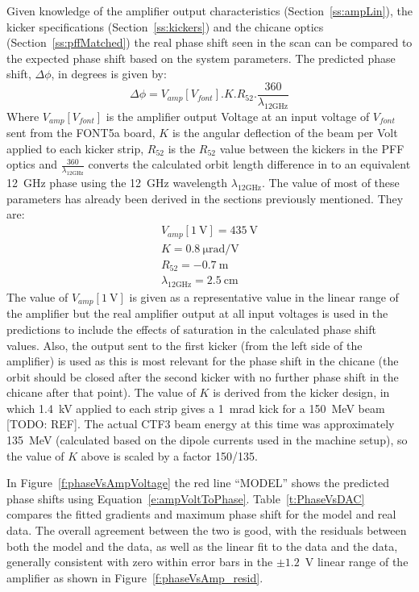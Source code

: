 Given knowledge of the amplifier output characteristics (Section~\ref{ss:ampLin}), the kicker specifications (Section~\ref{ss:kickers}) and the chicane optics (Section~\ref{ss:pffMatched}) the real phase shift seen in the scan can be compared to the expected phase shift based on the system parameters. The predicted phase shift, \(\Delta\phi\), in degrees is given by:
\begin{equation}
 	\Delta\phi = V_{amp}[V_{font}].K.R_{52}.\frac{360}{\lambda_{12\mathrm{GHz}}}
\end{equation} 
\label{e:ampVoltToPhase}
Where \(V_{amp}[V_{font}]\) is the amplifier output Voltage at an input voltage of \(V_{font}\) sent from the FONT5a board, \(K\) is the angular deflection of the beam per Volt applied to each kicker strip, \(R_{52}\) is the \(R_{52}\) value between the kickers in the PFF optics and \(\frac{360}{\lambda_{12\mathrm{GHz}}}\) converts the calculated orbit length difference in to an equivalent 12~GHz phase using the 12~GHz wavelength \(\lambda_{12\mathrm{GHz}}\). The value of most of these parameters has already been derived in the sections previously mentioned. They are:
\begin{eqnarray*}
V_{amp}[1~\mathrm{V}] = 435~\mathrm{V} \\
K = 0.8~\mathrm{\mu rad/V}\\
R_{52} = -0.7~\mathrm{m}\\
\lambda_{12\mathrm{GHz}} = 2.5~\mathrm{cm} 
\end{eqnarray*}
The value of \(V_{amp}[1~\mathrm{V}]\) is given as a representative value in the linear range of the amplifier but the real amplifier output at all input voltages is used in the predictions to include the effects of saturation in the calculated phase shift values. Also, the output sent to the first kicker (from the left side of the amplifier) is used as this is most relevant for the phase shift in the chicane (the orbit should be closed after the second kicker with no further phase shift in the chicane after that point). The value of \(K\) is derived from the kicker design, in which 1.4~kV applied to each strip gives a 1~mrad kick for a 150~MeV beam [TODO: REF].  The actual CTF3 beam energy at this time was approximately 135~MeV (calculated based on the dipole currents used in the machine setup), so the value of \(K\) above is scaled by a factor 150/135.

In Figure~\ref{f:phaseVsAmpVoltage} the red line ``MODEL'' shows the predicted phase shifts using Equation~\ref{e:ampVoltToPhase}. Table~\ref{t:PhaseVsDAC} compares the fitted gradients and maximum phase shift for the model and real data. The overall agreement between the two is good, with the residuals between both the model and the data, as well as the linear fit to the data and the data, generally consistent with zero within error bars in the \(\pm1.2\)~V linear range of the amplifier as shown in Figure~\ref{f:phaseVsAmp_resid}. 

